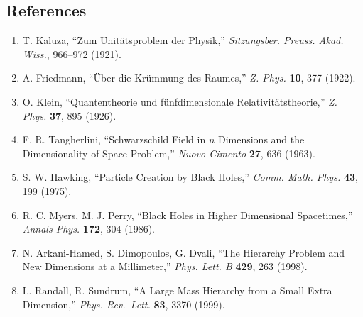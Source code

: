 \documentclass[a4paper,11pt]{article}
\theoremstyle{definition}
\providecommand{\tightlist}{\setlength{\itemsep}{0pt}\setlength{\parskip}{0pt}}
\begin{document}
\subsection{References}\label{references}

\begin{enumerate}
\def\labelenumi{\arabic{enumi}.}
\tightlist
\item
  T. Kaluza, ``Zum Unitätsproblem der Physik,'' \emph{Sitzungsber.
  Preuss. Akad. Wiss.}, 966--972 (1921).
\item
  A. Friedmann, ``Über die Krümmung des Raumes,'' \emph{Z. Phys.}
  \textbf{10}, 377 (1922).
\item
  O. Klein, ``Quantentheorie und fünfdimensionale Relativitätstheorie,''
  \emph{Z. Phys.} \textbf{37}, 895 (1926).
\item
  F. R. Tangherlini, ``Schwarzschild Field in \(n\) Dimensions and the
  Dimensionality of Space Problem,'' \emph{Nuovo Cimento} \textbf{27},
  636 (1963).
\item
  S. W. Hawking, ``Particle Creation by Black Holes,'' \emph{Comm. Math.
  Phys.} \textbf{43}, 199 (1975).
\item
  R. C. Myers, M. J. Perry, ``Black Holes in Higher Dimensional
  Spacetimes,'' \emph{Annals Phys.} \textbf{172}, 304 (1986).
\item
  N. Arkani-Hamed, S. Dimopoulos, G. Dvali, ``The Hierarchy Problem and
  New Dimensions at a Millimeter,'' \emph{Phys. Lett. B} \textbf{429},
  263 (1998).
\item
  L. Randall, R. Sundrum, ``A Large Mass Hierarchy from a Small Extra
  Dimension,'' \emph{Phys. Rev.~Lett.} \textbf{83}, 3370 (1999).
\end{enumerate}
\end{document}
